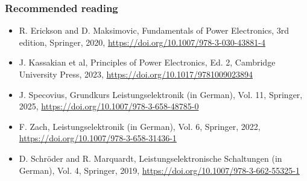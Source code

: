 \begin{frame}
	\frametitle{Recommended reading}
	\begin{itemize}
		\item R. Erickson and D. Maksimovic, Fundamentals of Power Electronics, 3rd edition, Springer, 2020, \url{https://doi.org/10.1007/978-3-030-43881-4}
		\item J. Kassakian et al, Principles of Power Electronics, Ed. 2,  Cambridge University Press, 2023, \url{https://doi.org/10.1017/9781009023894}
		\item J. Specovius, Grundkurs Leistungselektronik (in German), Vol. 11, Springer, 2025, \url{https://doi.org/10.1007/978-3-658-48785-0}
		\item F. Zach, Leistungselektronik (in German), Vol. 6, Springer, 2022, \url{https://doi.org/10.1007/978-3-658-31436-1}
		\item D. Schröder and R. Marquardt, Leistungselektronische	Schaltungen (in German), Vol. 4, Springer, 2019, \url{https://doi.org/10.1007/978-3-662-55325-1}
	\end{itemize}
\end{frame}
